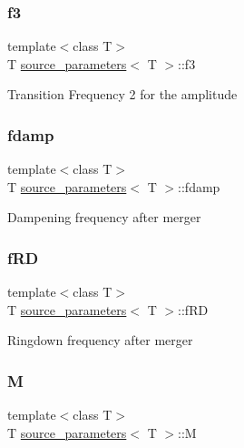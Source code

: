 \subsubsection{\texorpdfstring{f3}{f3}}
{\footnotesize\ttfamily template$<$class T$>$ \\
T \hyperlink{structsource__parameters}{source\+\_\+parameters}$<$ T $>$\+::f3}

Transition Frequency 2 for the amplitude \mbox{\label{structsource__parameters_adf9f63901b2a77eb0b89bba6ff68239e}} 
\subsubsection{\texorpdfstring{fdamp}{fdamp}}
{\footnotesize\ttfamily template$<$class T$>$ \\
T \hyperlink{structsource__parameters}{source\+\_\+parameters}$<$ T $>$\+::fdamp}

Dampening frequency after merger \mbox{\label{structsource__parameters_ad221b8f66ef2d9fd878b1c70461b60db}} 
\subsubsection{\texorpdfstring{f\+RD}{fRD}}
{\footnotesize\ttfamily template$<$class T$>$ \\
T \hyperlink{structsource__parameters}{source\+\_\+parameters}$<$ T $>$\+::f\+RD}

Ringdown frequency after merger \mbox{\label{structsource__parameters_a52eefefefdf8c0bc989b64a115aed48a}} 
\subsubsection{\texorpdfstring{M}{M}}
{\footnotesize\ttfamily template$<$class T$>$ \\
T \hyperlink{structsource__parameters}{source\+\_\+parameters}$<$ T $>$\+::M}


